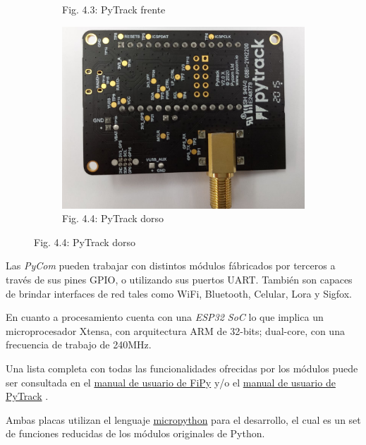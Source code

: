 \documentclass[12pt]{article}
\begin{document}
\begin{figure}[ht]
\begin{subfigure}[b]{0.45\linewidth}
    \caption{Fig. 4.3: PyTrack frente}
    \label{fig:PyTrack-fte}
  \end{subfigure}
  \begin{subfigure}[b]{0.45\linewidth}
    \includegraphics[width=\linewidth]{images/PyTrack-2.jpg}
    \caption{Fig. 4.4: PyTrack dorso}
    \label{fig:PyTrack-dor}
  \end{subfigure}
\end{figure}

Las \textit{PyCom} pueden trabajar con distintos módulos fábricados por terceros a través de sus pines GPIO, o utilizando sus puertos UART. También son capaces de brindar interfaces de red tales como WiFi, Bluetooth, Celular, Lora y Sigfox.

En cuanto a procesamiento cuenta con una \textit{ESP32 SoC} lo que implica un microprocesador Xtensa, con arquitectura ARM de 32-bits; dual-core, con una frecuencia de trabajo de 240MHz.

Una lista completa con todas las funcionalidades ofrecidas por los módulos puede ser consultada en el \href{https://docs.pycom.io/gitbook/assets/specsheets/Pycom_002_Specsheets_FiPy_v2.pdf}{manual de usuario de FiPy} \cite{fipy} y/o el \href{https://pycom.io/product/pytrack-2-0-x/}{manual de usuario de PyTrack} \cite{pytrack}.

Ambas placas utilizan el lenguaje \href{https://github.com/micropython/micropython}{micropython} \cite{micropython} para el desarrollo, el cual es un set de funciones reducidas de los módulos originales de Python.
\end{document}
